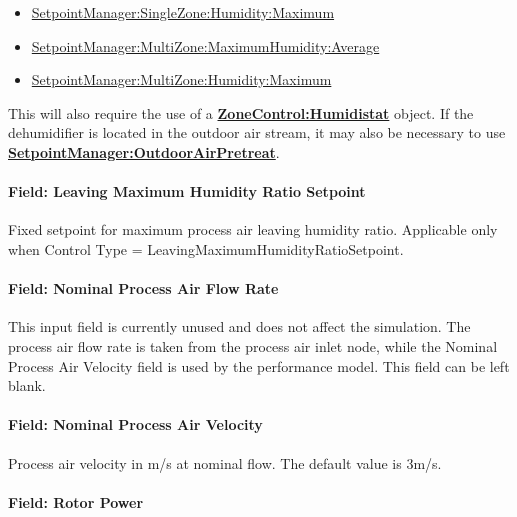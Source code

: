 \begin{itemize}
\item
  \hyperref[setpointmanagersinglezonehumiditymaximum]{SetpointManager:SingleZone:Humidity:Maximum}
\item
  \hyperref[setpointmanagermultizonemaximumhumidityaverage]{SetpointManager:MultiZone:MaximumHumidity:Average}
\item
  \hyperref[setpointmanagermultizonehumiditymaximum]{SetpointManager:MultiZone:Humidity:Maximum}
\end{itemize}

This will also require the use of a \textbf{\hyperref[zonecontrolhumidistat]{ZoneControl:Humidistat}} object. If the dehumidifier is located in the outdoor air stream, it may also be necessary to use \textbf{\hyperref[setpointmanageroutdoorairpretreat]{SetpointManager:OutdoorAirPretreat}}.

\paragraph{Field: Leaving Maximum Humidity Ratio Setpoint}\label{field-leaving-maximum-humidity-ratio-setpoint}

Fixed setpoint for maximum process air leaving humidity ratio. Applicable only when Control Type = LeavingMaximumHumidityRatioSetpoint.

\paragraph{Field: Nominal Process Air Flow Rate}\label{field-nominal-process-air-flow-rate}

This input field is currently unused and does not affect the simulation. The process air flow rate is taken from the process air inlet node, while the Nominal Process Air Velocity field is used by the performance model. This field can be left blank.

\paragraph{Field: Nominal Process Air Velocity}\label{field-nominal-process-air-velocity}

Process air velocity in m/s at nominal flow. The default value is 3m/s.

\paragraph{Field: Rotor Power}\label{field-rotor-power}

